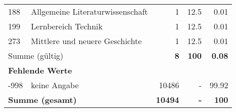 \begin{longtable}{lXrrr}
     188 &
     \multicolumn{1}{X}{ Allgemeine Literaturwissenschaft   } &


       \num{1} &
       \num[round-mode=places,round-precision=2]{12.5} &
         \num[round-mode=places,round-precision=2]{0.01} \\

     199 &
     \multicolumn{1}{X}{ Lernbereich Technik   } &


       \num{1} &
       \num[round-mode=places,round-precision=2]{12.5} &
         \num[round-mode=places,round-precision=2]{0.01} \\

     273 &
     \multicolumn{1}{X}{ Mittlere und neuere Geschichte   } &


       \num{1} &
       \num[round-mode=places,round-precision=2]{12.5} &
         \num[round-mode=places,round-precision=2]{0.01} \\
     \midrule
     \multicolumn{2}{l}{Summe (gültig)} &
       \textbf{\num{8}} &
     \textbf{\num{100}} &
       \textbf{\num[round-mode=places,round-precision=2]{0.08}} \\
     \multicolumn{5}{l}{\textbf{Fehlende Werte}}\\
       -998 &
       keine Angabe &
         \num{10486} &
        - &
         \num[round-mode=places,round-precision=2]{99.92} \\
     \midrule
     \multicolumn{2}{l}{\textbf{Summe (gesamt)}} &
          \textbf{\num{10494}} &
        \textbf{-} &
        \textbf{\num{100}} \\
     \bottomrule
     \end{longtable}
     
